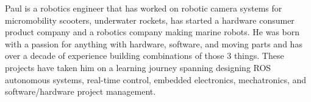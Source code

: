 

\begin{cvparagraph}

Paul is a robotics engineer that has worked on robotic camera systems for micromobility
scooters, underwater rockets, has started a hardware consumer product company
and a robotics company making marine robots. He was born with a passion
for anything with hardware, software, and moving parts and has over a decade of
experience building combinations of those 3 things. These projects have taken
him on a learning journey spanning designing ROS autonomous systems, real-time
control, embedded electronics, mechatronics, and software/hardware project
management.
\end{cvparagraph}
